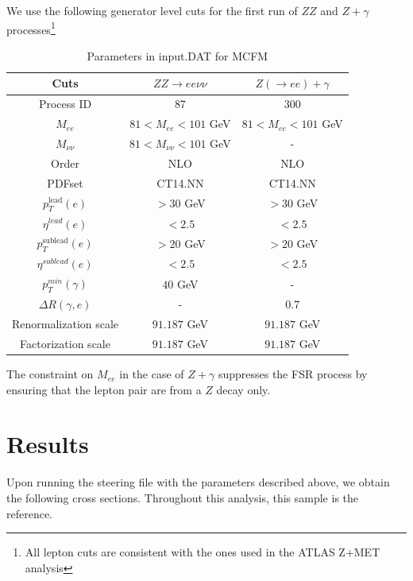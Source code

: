 \documentclass[11pt,a4paper,final]{report}
\begin{document}
We use the following generator level cuts for the first run of $ZZ$ and $Z+\gamma$ processes\footnote{All lepton cuts are consistent with the ones used in the ATLAS Z+MET analysis}
\begin{table}[H]
\begin{center}
	\begin{tabular}{|c|c|c|}
	\hline
	\textbf{Cuts} &$ZZ \rightarrow ee\nu\nu$ & $Z(\rightarrow ee)+\gamma$\\
	\hline
	Process ID & 87 & 300\\
	$M_{ee}$ & $81 < M_{ee} < 101$ GeV & $81 < M_{ee} < 101$ GeV\\
	$M_{\nu\nu}$ & $81 < M_{\nu\nu} < 101$ GeV& -\\
	Order & NLO & NLO\\
	PDFset & CT14.NN & CT14.NN\\
	$p_T^{\text{lead}}(e)$ & $> 30$ GeV & $> 30$ GeV\\
	$\eta^{lead}(e)$ & $< 2.5$ & $< 2.5$\\
	$p_T^{\text{sublead}}(e)$ & $> 20$ GeV & $> 20$ GeV\\
	$\eta^{sublead}(e)$ & $< 2.5$ & $< 2.5$\\
	$p_T^{min}(\gamma)$ & $40$ GeV & -\\
	$\Delta R(\gamma,e)$ & - & 0.7\\
	Renormalization scale & $91.187$ GeV & $91.187$ GeV\\
	Factorization scale & $91.187$ GeV & $91.187$ GeV\\
	\hline
	\end{tabular}
	\caption{Parameters in input.DAT for MCFM}
	\end{center}
	\label{table:default}
\end{table}

The constraint on $M_{ee}$ in the case of $Z+\gamma$ suppresses the FSR process by ensuring that the lepton pair are from a $Z$ decay only.

\section{Results}
Upon running the steering file with the parameters described above, we obtain the following cross sections. Throughout this analysis, this sample is the reference.

\end{document}
